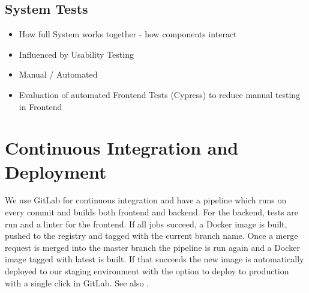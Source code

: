 \subsection{System Tests}
\begin{itemize}
    \item How full System works together - how components interact
    \item Influenced by Usability Testing
    \item Manual / Automated
    \item Evaluation of automated Frontend Tests (Cypress) to reduce manual testing in Frontend
\end{itemize}

\section{Continuous Integration and Deployment}
We use GitLab for continuous integration and have a pipeline which runs on every commit and builds both frontend and backend.
For the backend, tests are run and a linter for the frontend. If all jobs succeed, a Docker image is built, pushed to the registry and tagged with the current branch name.
Once a merge request is merged into the master branch the pipeline is run again and a Docker image tagged with latest is built.
If that succeeds the new image is automatically deployed to our staging environment with the option to deploy to production with a single click in GitLab. See also .
